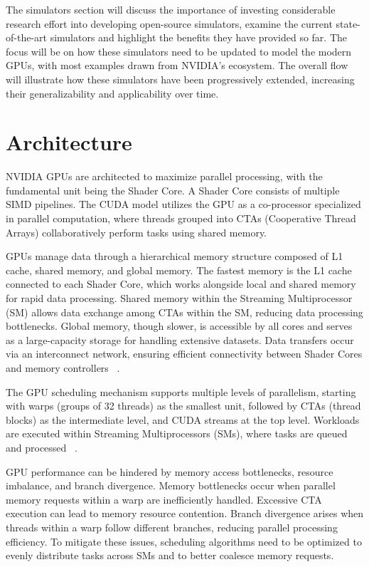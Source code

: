 \documentclass[conference]{IEEEtran}
\begin{document}
The simulators section will discuss the importance of investing considerable research effort into developing open-source simulators, examine the current state-of-the-art simulators and highlight the benefits they have provided so far.
The focus will be on how these simulators need to be updated to model the modern GPUs, with most examples drawn from NVIDIA's ecosystem.
The overall flow will illustrate how these simulators have been progressively extended, increasing their generalizability and applicability over time.
\section{Architecture}

NVIDIA GPUs are architected to maximize parallel processing, with the fundamental unit being the Shader Core. A Shader Core consists of multiple SIMD pipelines. The CUDA model utilizes the GPU as a co-processor specialized in parallel computation, where threads grouped into CTAs (Cooperative Thread Arrays) collaboratively perform tasks using shared memory.

GPUs manage data through a hierarchical memory structure composed of L1 cache, shared memory, and global memory. The fastest memory is the L1 cache connected to each Shader Core, which works alongside local and shared memory for rapid data processing. Shared memory within the Streaming Multiprocessor (SM) allows data exchange among CTAs within the SM, reducing data processing bottlenecks. Global memory, though slower, is accessible by all cores and serves as a large-capacity storage for handling extensive datasets. Data transfers occur via an interconnect network, ensuring efficient connectivity between Shader Cores and memory controllers ~\cite{Bakhoda2009}.

The GPU scheduling mechanism supports multiple levels of parallelism, starting with warps (groups of 32 threads) as the smallest unit, followed by CTAs (thread blocks) as the intermediate level, and CUDA streams at the top level. Workloads are executed within Streaming Multiprocessors (SMs), where tasks are queued and processed ~\cite{Sanudo2020}.

GPU performance can be hindered by memory access bottlenecks, resource imbalance, and branch divergence. Memory bottlenecks occur when parallel memory requests within a warp are inefficiently handled. Excessive CTA execution can lead to memory resource contention. Branch divergence arises when threads within a warp follow different branches, reducing parallel processing efficiency. To mitigate these issues, scheduling algorithms need to be optimized to evenly distribute tasks across SMs and to better coalesce memory requests.
\end{document}
